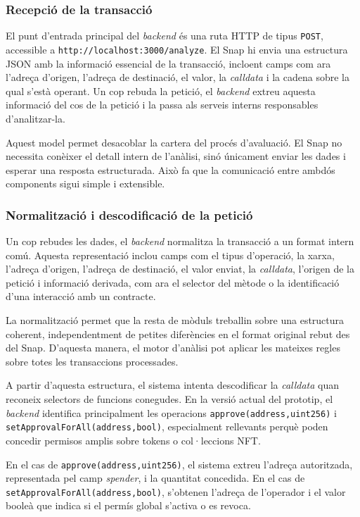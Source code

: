 \subsubsection{Recepció de la transacció}

El punt d’entrada principal del \textit{backend} és una ruta HTTP de tipus \texttt{POST}, accessible a \texttt{http://localhost:3000/analyze}. El Snap hi envia una estructura JSON amb la informació essencial de la transacció, incloent camps com ara l’adreça d’origen, l’adreça de destinació, el valor, la \textit{calldata} i la cadena sobre la qual s’està operant. Un cop rebuda la petició, el \textit{backend} extreu aquesta informació del cos de la petició i la passa als serveis interns responsables d’analitzar-la. 

Aquest model permet desacoblar la cartera del procés d’avaluació. El Snap no necessita conèixer el detall intern de l’anàlisi, sinó únicament enviar les dades i esperar una resposta estructurada. Això fa que la comunicació entre ambdós components sigui simple i extensible.

\subsubsection{Normalització i descodificació de la petició}

Un cop rebudes les dades, el \textit{backend} normalitza la transacció a un format intern comú. Aquesta representació inclou camps com el tipus d’operació, la xarxa, l’adreça d’origen, l’adreça de destinació, el valor enviat, la \textit{calldata}, l’origen de la petició i informació derivada, com ara el selector del mètode o la identificació d’una interacció amb un contracte.

La normalització permet que la resta de mòduls treballin sobre una estructura coherent, independentment de petites diferències en el format original rebut des del Snap. D’aquesta manera, el motor d’anàlisi pot aplicar les mateixes regles sobre totes les transaccions processades.

A partir d’aquesta estructura, el sistema intenta descodificar la \textit{calldata} quan reconeix selectors de funcions conegudes. En la versió actual del prototip, el \textit{backend} identifica principalment les operacions \texttt{approve(address,uint256)} i \texttt{setApprovalForAll(address,bool)}, especialment rellevants perquè poden concedir permisos amplis sobre tokens o col·leccions NFT.

En el cas de \texttt{approve(address,uint256)}, el sistema extreu l’adreça autoritzada, representada pel camp \textit{spender}, i la quantitat concedida. En el cas de \texttt{setApprovalForAll(address,bool)}, s’obtenen l’adreça de l’operador i el valor booleà que indica si el permís global s’activa o es revoca.

